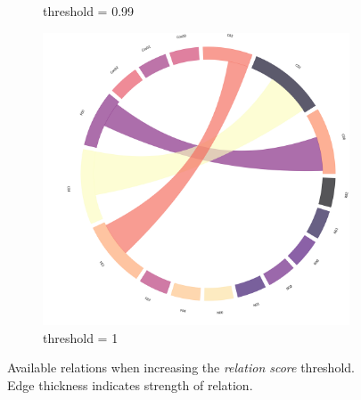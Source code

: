 \begin{figure}[!h]
\begin{subfigure}[b]{0.3\linewidth}
		\caption{threshold = 0.99}
	\end{subfigure}
	\hfill
	\begin{subfigure}[b]{0.3\linewidth}
		\includegraphics[width=\linewidth]{figures/chords/chord_swap_ensemble1000_RCN53333001.png}
		\caption{threshold = 1}
	\end{subfigure}
	\caption{Available relations when increasing the \emph{relation score} threshold. Edge thickness indicates strength of relation.}
	\label{fig:tosaqui1}
\end{figure}

